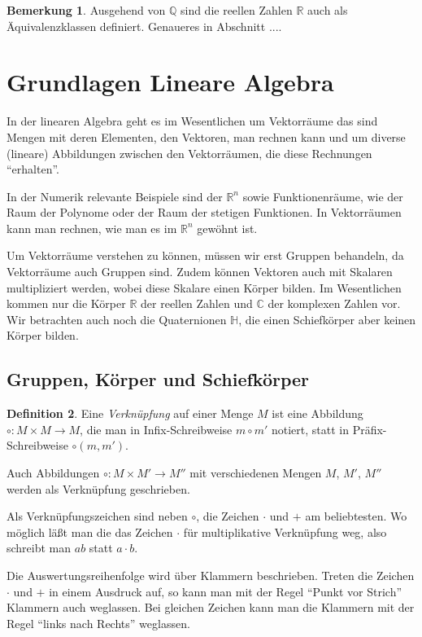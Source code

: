 \documentclass[index=totoc]{scrartcl}%
\theoremstyle{definition}
\newtheorem{defi}{Definition}[section]
\newtheorem{bem}[defi]{Bemerkung}
\newcommand{\Q}{\mathbb Q}
\newcommand{\R}{\mathbb R}
\newcommand{\C}{\mathbb C}
\newcommand{\Hd}{\mathbb H}
\begin{document}
\begin{bem}
  Ausgehend von $\Q$ sind die reellen Zahlen $\R$ auch als Äquivalenzklassen
  definiert.
  Genaueres in Abschnitt .... 
\end{bem}



\section{Grundlagen Lineare Algebra}
\label{sec:laBasics}

In der linearen Algebra geht es im Wesentlichen um Vektorräume
das sind Mengen mit deren Elementen, den Vektoren, man rechnen kann 
und um diverse (lineare) Abbildungen zwischen den Vektorräumen,
die diese Rechnungen "`erhalten"'.

In der Numerik relevante Beispiele sind der $\R^n$
sowie Funktionenräume, wie der Raum der Polynome
oder der Raum der stetigen Funktionen.
In Vektorräumen kann man rechnen, wie man es im $\R^n$ gewöhnt ist. 

Um Vektorräume verstehen zu können, müssen wir erst Gruppen behandeln, 
da Vektorräume auch Gruppen sind.
Zudem können Vektoren auch mit Skalaren multipliziert werden,
wobei diese Skalare einen Körper bilden.
Im Wesentlichen kommen nur die Körper $\R$ der reellen Zahlen
und $\C$ der komplexen Zahlen vor.
Wir betrachten auch noch die Quaternionen $\Hd$,
die einen Schiefkörper aber keinen Körper bilden.



\subsection{Gruppen, Körper und Schiefkörper}
\label{sec:grpField}

\begin{defi}
  Eine {\em Verknüpfung} auf einer Menge $M$
  ist eine Abbildung  $\circ\colon M\times M\to M$,
  die man in Infix-Schreibweise $m\circ m'$ notiert,
  statt in Präfix-Schreibweise $\circ(m, m')$.

  Auch Abbildungen $\circ\colon M\times M'\to M''$
  mit verschiedenen Mengen $M$, $M'$, $M''$ werden als Verknüpfung geschrieben.

  Als Verknüpfungszeichen sind neben $\circ$,
  die Zeichen $\cdot$ und $+$ am beliebtesten. 
  Wo möglich läßt man die das Zeichen $\cdot$
  für multiplikative Verknüpfung weg,
  also schreibt man $ab$ statt $a\cdot b$.

  Die Auswertungsreihenfolge wird über Klammern beschrieben.
  Treten die Zeichen $\cdot$ und $+$ in einem Ausdruck auf,
  so kann man mit der Regel "`Punkt vor Strich"' Klammern auch weglassen.
  Bei gleichen Zeichen
  kann man die Klammern mit der Regel "`links nach Rechts"' weglassen. 
\end{defi}
\end{document}
